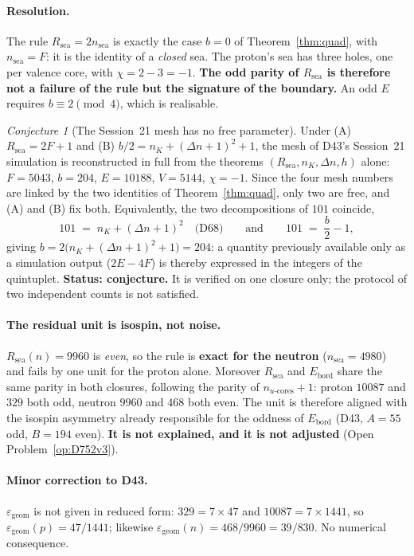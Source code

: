 \documentclass[11pt,a4paper]{article}
\newcommand{\Rsea}{R_{\mathrm{sea}}}
\theoremstyle{plain}
\theoremstyle{definition}
\theoremstyle{remark}
\newtheorem{conjecture}[theorem]{Conjecture}
\begin{document}
\paragraph{Resolution.} The rule $\Rsea=2n_{\mathrm{sea}}$ is exactly the case $b=0$ of Theorem~\ref{thm:quad}, with $n_{\mathrm{sea}}=F$: it is the identity of a \emph{closed} sea. The proton's sea has three holes, one per valence core, with $\chi=2-3=-1$. \textbf{The odd parity of $\Rsea$ is therefore not a failure of the rule but the signature of the boundary.} An odd $E$ requires $b\equiv 2 \pmod 4$, which is realisable.

\begin{conjecture}[The Session~21 mesh has no free parameter]
\label{conj:mesh}
Under (A) $\Rsea=2F+1$ and (B) $b/2=n_K+(\Delta n+1)^2+1$, the mesh of D43's Session~21 simulation is reconstructed in full from the theorems $(\Rsea, n_K, \Delta n, h)$ alone: $F=5043$, $b=204$, $E=10188$, $V=5144$, $\chi=-1$. Since the four mesh numbers are linked by the two identities of Theorem~\ref{thm:quad}, only two are free, and (A) and (B) fix both. Equivalently, the two decompositions of $101$ coincide,
\[
101 \;=\; n_K+(\Delta n+1)^2 \quad\text{(D68)} \qquad\text{and}\qquad 101 \;=\; \frac{b}{2}-1 ,
\]
giving $b = 2\bigl(n_K+(\Delta n+1)^2+1\bigr) = 204$: a quantity previously available only as a simulation output ($2E-4F$) is thereby expressed in the integers of the quintuplet. \textbf{Status: conjecture.} It is verified on one closure only; the protocol of two independent counts is not satisfied.
\end{conjecture}

\paragraph{The residual unit is isospin, not noise.} $\Rsea(n)=9960$ is \emph{even}, so the rule is \textbf{exact for the neutron} ($n_{\mathrm{sea}}=4980$) and fails by one unit for the proton alone. Moreover $\Rsea$ and $E_{\mathrm{bord}}$ share the same parity in both closures, following the parity of $n_{u\text{-cores}}+1$: proton $10087$ and $329$ both odd, neutron $9960$ and $468$ both even. The unit is therefore aligned with the isospin asymmetry already responsible for the oddness of $E_{\mathrm{bord}}$ (D43, $A=55$ odd, $B=194$ even). \textbf{It is not explained, and it is not adjusted} (Open Problem~\ref{op:D752v3}).

\paragraph{Minor correction to D43.} $\varepsilon_{\mathrm{geom}}$ is not given in reduced form: $329=7\times47$ and $10087=7\times1441$, so $\varepsilon_{\mathrm{geom}}(p)=47/1441$; likewise $\varepsilon_{\mathrm{geom}}(n)=468/9960=39/830$. No numerical consequence.
\end{document}
